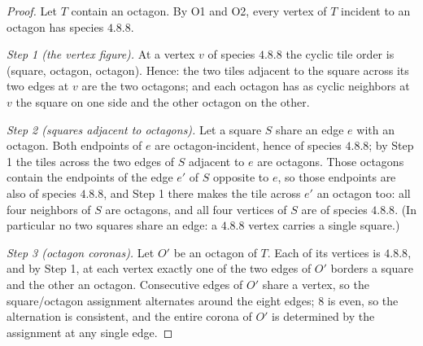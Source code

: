 \documentclass[11pt]{article}
\theoremstyle{definition}
\begin{document}
\begin{proof}
Let $T$ contain an octagon. By O1 and O2, every vertex of $T$ incident to an octagon has
species $4.8.8$.

\emph{Step 1 (the vertex figure).} At a vertex $v$ of species $4.8.8$ the cyclic tile
order is (square, octagon, octagon). Hence: the two tiles adjacent to the square across
its two edges at $v$ are the two octagons; and each octagon has as cyclic neighbors at
$v$ the square on one side and the other octagon on the other.

\emph{Step 2 (squares adjacent to octagons).} Let a square $S$ share an edge $e$ with an
octagon. Both endpoints of $e$ are octagon-incident, hence of species $4.8.8$; by Step 1
the tiles across the two edges of $S$ adjacent to $e$ are octagons. Those octagons
contain the endpoints of the edge $e'$ of $S$ opposite to $e$, so those endpoints are
also of species $4.8.8$, and Step 1 there makes the tile across $e'$ an octagon too: all
four neighbors of $S$ are octagons, and all four vertices of $S$ are of species $4.8.8$.
(In particular no two squares share an edge: a $4.8.8$ vertex carries a single square.)

\emph{Step 3 (octagon coronas).} Let $O'$ be an octagon of $T$. Each of its vertices is
$4.8.8$, and by Step 1, at each vertex exactly one of the two edges of $O'$ borders a
square and the other an octagon. Consecutive edges of $O'$ share a vertex, so the
square/octagon assignment alternates around the eight edges; $8$ is even, so the
alternation is consistent, and the entire corona of $O'$ is determined by the assignment
at any single edge.


\end{proof}
\end{document}
